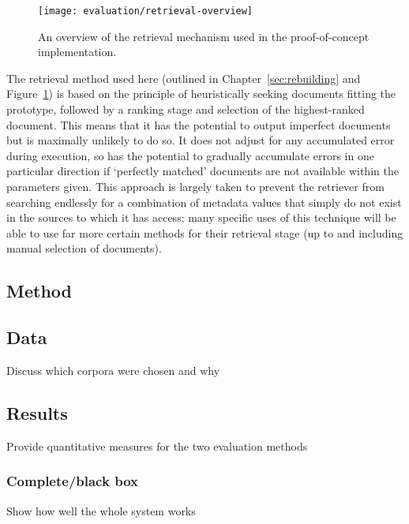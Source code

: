 


\begin{figure}[Ht]
    \centering
    \texttt{[image: evaluation/retrieval-overview]}
    \caption{An overview of the retrieval mechanism used in the proof-of-concept implementation.}
    \label{fig:evaluation:retrieval:outline}
\end{figure}



The retrieval method used here (outlined in Chapter~\ref{sec:rebuilding} and Figure~\ref{fig:evaluation:retrieval:outline}) is based on the principle of heuristically seeking documents fitting the prototype, followed by a ranking stage and selection of the highest-ranked document.  This means that it has the potential to output imperfect documents but is maximally unlikely to do so.  It does not adjust for any accumulated error during execution, so has the potential to gradually accumulate errors in one particular direction if `perfectly matched' documents are not available within the parameters given.  This approach is largely taken to prevent the retriever from searching endlessly for a combination of metadata values that simply do not exist in the sources to which it has access: many specific uses of this technique will be able to use far more certain methods for their retrieval stage (up to and including manual selection of documents).



\subsection{Method}
\label{sec:evaluation:method}





\subsection{Data}
\label{sec:evaluation:method}
Discuss which corpora were chosen and why

\subsection{Results}
\label{sec:evaluation:}
Provide quantitative measures for the two evaluation methods
\subsubsection{Complete/black box}
Show how well the whole system works

